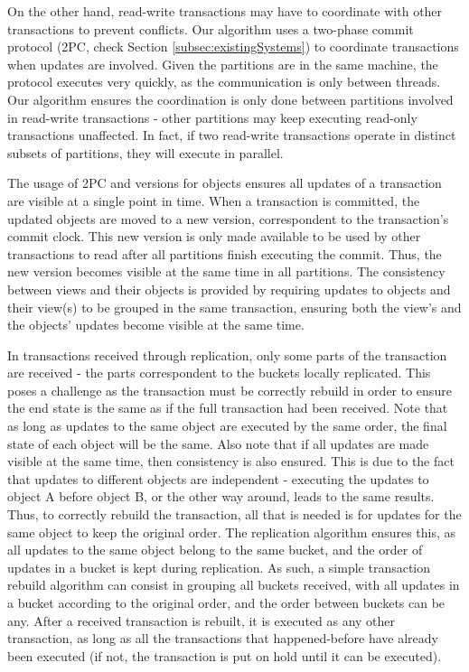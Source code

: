 On the other hand, read-write transactions may have to coordinate with other transactions to prevent conflicts.
Our algorithm uses a two-phase commit protocol (2PC, check Section \ref{subsec:existingSystems}) to coordinate transactions when updates are involved.
Given the partitions are in the same machine, the protocol executes very quickly, as the communication is only between threads.
Our algorithm ensures the coordination is only done between partitions involved in read-write transactions - other partitions may keep executing read-only transactions unaffected.
In fact, if two read-write transactions operate in distinct subsets of partitions, they will execute in parallel.

The usage of 2PC and versions for objects ensures all updates of a transaction are visible at a single point in time.
When a transaction is committed, the updated objects are moved to a new version, correspondent to the transaction's commit clock.
This new version is only made available to be used by other transactions to read after all partitions finish executing the commit.
Thus, the new version becomes visible at the same time in all partitions.
The consistency between views and their objects is provided by requiring updates to objects and their view(s) to be grouped in the same transaction, ensuring both the view's and the objects' updates become visible at the same time.

In transactions received through replication, only some parts of the transaction are received - the parts correspondent to the buckets locally replicated.
This poses a challenge as the transaction must be correctly rebuild in order to ensure the end state is the same as if the full transaction had been received.
Note that as long as updates to the same object are executed by the same order, the final state of each object will be the same.
Also note that if all updates are made visible at the same time, then consistency is also ensured.
This is due to the fact that updates to different objects are independent - executing the updates to object A before object B, or the other way around, leads to the same results.
Thus, to correctly rebuild the transaction, all that is needed is for updates for the same object to keep the original order.
The replication algorithm ensures this, as all updates to the same object belong to the same bucket, and the order of updates in a bucket is kept during replication.
As such, a simple transaction rebuild algorithm can consist in grouping all buckets received, with all updates in a bucket according to the original order, and the order between buckets can be any.
After a received transaction is rebuilt, it is executed as any other transaction, as long as all the transactions that happened-before have already been executed (if not, the transaction is put on hold until it can be executed).

